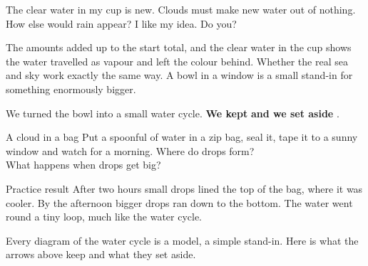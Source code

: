 \begin{center}
\end{center}

\begin{multix}[hmm]\multixbot[hmm]\tcblower
The clear water in my cup is new. Clouds must make new water out of nothing. How else would rain appear? I like my idea. Do you?
\end{multix}

{The amounts added up to the start total, and the clear water in the cup shows the water travelled as vapour and left the colour behind.}
{Whether the real sea and sky work exactly the same way. A bowl in a window is a small stand-in for something enormously bigger.}

\begin{keepbox}
We turned the bowl into a small water cycle. \textbf{We kept} \wline[3.4cm] \textbf{and we set aside} \wline[3.4cm].
\end{keepbox}

\clearpage

\begin{tryit}{A cloud in a bag}
Put a spoonful of water in a zip bag, seal it, tape it to a sunny window and watch for a morning. Where do drops form? \wline[4cm]\\
What happens when drops get big? \wline[4cm]
\end{tryit}

\begin{worked}{Practice result}
After two hours small drops lined the top of the bag, where it was cooler. By the afternoon bigger drops ran down to the bottom. The water went round a tiny loop, much like the water cycle.
\end{worked}

Every diagram of the water cycle is a model, a simple stand-in. Here is what the arrows above keep and what they set aside.

